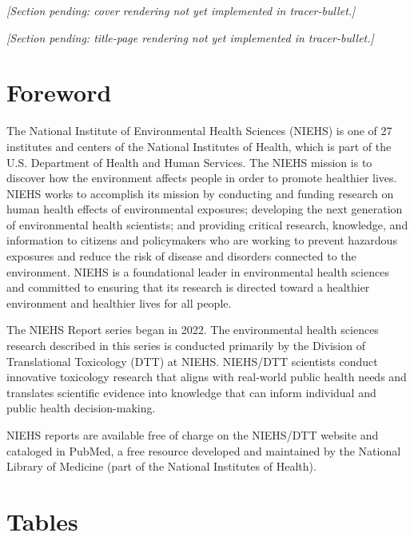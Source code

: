 \emph{[Section pending: cover rendering not yet implemented in tracer-bullet.]}

\emph{[Section pending: title-page rendering not yet implemented in tracer-bullet.]}

\tableofcontents

\section{Foreword}

The National Institute of Environmental Health Sciences (NIEHS) is one of 27 institutes and centers of the National Institutes of Health, which is part of the U.S. Department of Health and Human Services. The NIEHS mission is to discover how the environment affects people in order to promote healthier lives. NIEHS works to accomplish its mission by conducting and funding research on human health effects of environmental exposures; developing the next generation of environmental health scientists; and providing critical research, knowledge, and information to citizens and policymakers who are working to prevent hazardous exposures and reduce the risk of disease and disorders connected to the environment. NIEHS is a foundational leader in environmental health sciences and committed to ensuring that its research is directed toward a healthier environment and healthier lives for all people.

The NIEHS Report series began in 2022. The environmental health sciences research described in this series is conducted primarily by the Division of Translational Toxicology (DTT) at NIEHS. NIEHS/DTT scientists conduct innovative toxicology research that aligns with real-world public health needs and translates scientific evidence into knowledge that can inform individual and public health decision-making.

NIEHS reports are available free of charge on the NIEHS/DTT website and cataloged in PubMed, a free resource developed and maintained by the National Library of Medicine (part of the National Institutes of Health).

\section{Tables}

